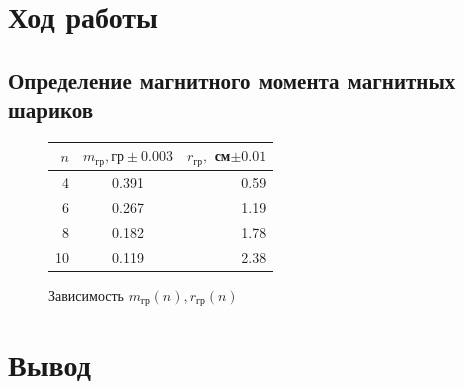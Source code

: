 \documentclass[12pt,a4paper]{article}
\begin{document}
\section{Ход работы}
\subsection{Определение магнитного момента магнитных шариков}
  \begin{figure}[H]
    \begin{tabular}{|r|c|r|}
       $n$ & $m_\text{гр}, \text{гр} \pm 0.003$ &$r_\text{гр},$ см$\pm 0.01$\\
      \midrule
       4 & 0.391 & 0.59\\
       6 & 0.267 & 1.19\\
       8 & 0.182 & 1.78\\
      10 & 0.119 & 2.38\\
    \end{tabular}
    \caption{Зависимость $m_\text{гр}(n), r_\text{гр}(n)$}      
  \end{figure}
\section*{Вывод}
\end{document}
